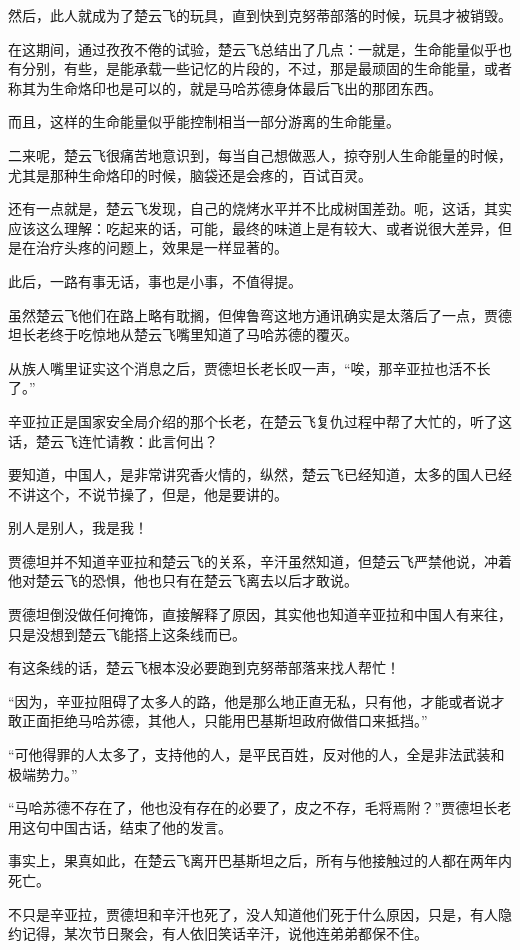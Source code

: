 然后，此人就成为了楚云飞的玩具，直到快到克努蒂部落的时候，玩具才被销毁。

在这期间，通过孜孜不倦的试验，楚云飞总结出了几点：一就是，生命能量似乎也有分别，有些，是能承载一些记忆的片段的，不过，那是最顽固的生命能量，或者称其为生命烙印也是可以的，就是马哈苏德身体最后飞出的那团东西。

而且，这样的生命能量似乎能控制相当一部分游离的生命能量。

二来呢，楚云飞很痛苦地意识到，每当自己想做恶人，掠夺别人生命能量的时候，尤其是那种生命烙印的时候，脑袋还是会疼的，百试百灵。

还有一点就是，楚云飞发现，自己的烧烤水平并不比成树国差劲。呃，这话，其实应该这么理解：吃起来的话，可能，最终的味道上是有较大、或者说很大差异，但是在治疗头疼的问题上，效果是一样显著的。

此后，一路有事无话，事也是小事，不值得提。

虽然楚云飞他们在路上略有耽搁，但俾鲁弯这地方通讯确实是太落后了一点，贾德坦长老终于吃惊地从楚云飞嘴里知道了马哈苏德的覆灭。

从族人嘴里证实这个消息之后，贾德坦长老长叹一声，“唉，那辛亚拉也活不长了。”

辛亚拉正是国家安全局介绍的那个长老，在楚云飞复仇过程中帮了大忙的，听了这话，楚云飞连忙请教：此言何出？

要知道，中国人，是非常讲究香火情的，纵然，楚云飞已经知道，太多的国人已经不讲这个，不说节操了，但是，他是要讲的。

别人是别人，我是我！

贾德坦并不知道辛亚拉和楚云飞的关系，辛汗虽然知道，但楚云飞严禁他说，冲着他对楚云飞的恐惧，他也只有在楚云飞离去以后才敢说。

贾德坦倒没做任何掩饰，直接解释了原因，其实他也知道辛亚拉和中国人有来往，只是没想到楚云飞能搭上这条线而已。

有这条线的话，楚云飞根本没必要跑到克努蒂部落来找人帮忙！

“因为，辛亚拉阻碍了太多人的路，他是那么地正直无私，只有他，才能或者说才敢正面拒绝马哈苏德，其他人，只能用巴基斯坦政府做借口来抵挡。”

“可他得罪的人太多了，支持他的人，是平民百姓，反对他的人，全是非法武装和极端势力。”

“马哈苏德不存在了，他也没有存在的必要了，皮之不存，毛将焉附？”贾德坦长老用这句中国古话，结束了他的发言。

事实上，果真如此，在楚云飞离开巴基斯坦之后，所有与他接触过的人都在两年内死亡。

不只是辛亚拉，贾德坦和辛汗也死了，没人知道他们死于什么原因，只是，有人隐约记得，某次节日聚会，有人依旧笑话辛汗，说他连弟弟都保不住。

